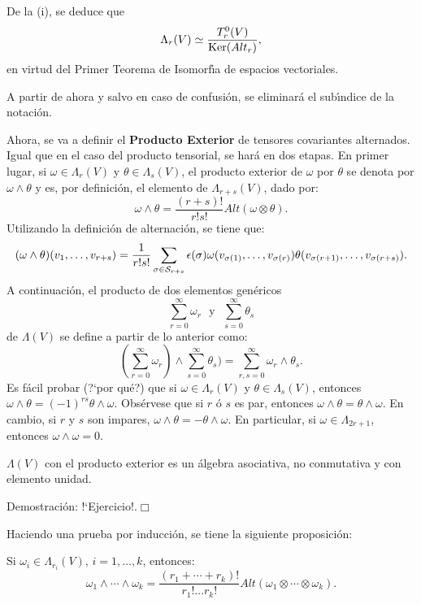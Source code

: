 \documentclass[cursovd_portada.tex]{subfiles}
\begin{document}
\par\bigskip
De la (i), se deduce que
$$\Lambda_r(V)\simeq\frac{T^0_r(V)}{{\rm Ker}(Alt_r)},$$
en virtud del Primer Teorema de Isomorf\'{\i}a de espacios vectoriales.
\par
A partir de ahora y salvo en caso de confusi\'{o}n, se eliminar\'{a} el sub\'{\i}ndice de la notaci\'{o}n.
\par
Ahora, se va a definir el {\bf Producto Exterior} de tensores covariantes alternados. Igual que en el caso del
producto tensorial, se har\'{a} en dos etapas. En primer lugar, si $\omega\in\Lambda_r(V)$ y $\theta\in\Lambda_s(V)$,
el producto exterior de $\omega$ por $\theta$ se denota por $\omega\wedge \theta$ y es, por definici\'{o}n, el
elemento de $\Lambda_{r+s}(V)$, dado por:
$$\omega\wedge\theta=\frac{(r+s)!}{r!s!}Alt(\omega\otimes\theta).$$
\hs Utilizando la definici\'{o}n de alternaci\'{o}n, se tiene que:
$$(\omega\wedge\theta )(v_1,\dots ,v_{r+s})=\frac{1}{r!s!}\sum_{\sigma\in{\cal
S}_{r+s}}\epsilon(\sigma)\omega(v_{\sigma (1)},\dots ,v_{\sigma (r)})\theta(v_ {\sigma (r+1)},\dots ,v_{\sigma
(r+s)}).$$ \hs A continuaci\'{o}n, el producto de dos elementos gen\'{e}ricos
$$\sum_{r=0}^{\infty}\omega_r\mbox{ }\mbox{y}\mbox{ }\sum_{s=0}^{\infty}\theta_s$$
de $\Lambda (V)$ se define a partir de lo anterior como:
$$(\sum_{r=0}^{\infty}\omega_r)\wedge \sum_{s=0}^{\infty}\theta_s)=\sum_
{r,s=0}^{\infty}\omega_r\wedge\theta _s.$$ \hs Es f\'{a}cil probar (?`por qu\'{e}?) que si $\omega\in\Lambda_r(V)$ y
$\theta\in\Lambda _s(V)$, entonces $\omega\wedge\theta=(-1)^{rs}\theta\wedge\omega$. Obs\'{e}rvese que si $r$ \'{o} $s$ es
par, entonces $\omega\wedge\theta=\theta\wedge\omega$. En cambio, si $r$ y $s$ son impares,
$\omega\wedge\theta=-\theta\wedge\omega$. En particular, si $\omega\in\Lambda_{2r+1}$, entonces
$\omega\wedge\omega=0$.
\begin{propoap}
$\Lambda (V)$ con el producto exterior es un \'{a}lgebra asociativa, no conmutativa y con elemento unidad.
\end{propoap}
{\sc Demostraci\'{o}n:} !`Ejercicio!.\hfill$\Box$
\par\bigskip
Haciendo una prueba por inducci\'{o}n, se tiene la siguiente proposici\'{o}n:
\begin{propoap}
Si $\omega_i\in\Lambda_{r_i}(V)$, $i=1,\dots ,k$, entonces:
$$\omega_1\wedge\cdots\wedge\omega_k=\frac{(r_1+\cdots +r_k)!}{r_1!\dots r_k!}
Alt(\omega_1\otimes\cdots\otimes\omega _k).$$
\end{propoap}
\par\bigskip
\end{document}
